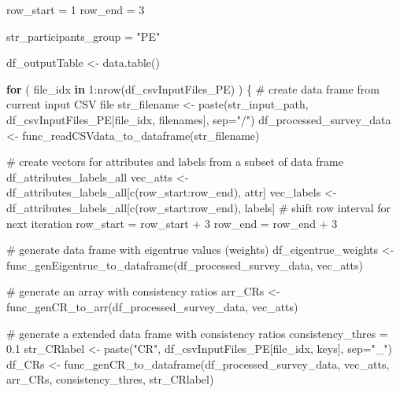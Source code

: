 \documentclass[
]{article}
\newenvironment{Shaded}{\begin{snugshade}}{\end{snugshade}}
\newcommand{\AttributeTok}[1]{\textcolor[rgb]{0.00,0.34,0.68}{#1}}
\newcommand{\CommentTok}[1]{\textcolor[rgb]{0.54,0.53,0.53}{#1}}
\newcommand{\ControlFlowTok}[1]{\textcolor[rgb]{0.12,0.11,0.11}{\textbf{#1}}}
\newcommand{\DecValTok}[1]{\textcolor[rgb]{0.69,0.50,0.00}{#1}}
\newcommand{\FloatTok}[1]{\textcolor[rgb]{0.69,0.50,0.00}{#1}}
\newcommand{\FunctionTok}[1]{\textcolor[rgb]{0.39,0.29,0.61}{#1}}
\newcommand{\NormalTok}[1]{\textcolor[rgb]{0.12,0.11,0.11}{#1}}
\newcommand{\OtherTok}[1]{\textcolor[rgb]{0.00,0.43,0.16}{#1}}
\newcommand{\SpecialCharTok}[1]{\textcolor[rgb]{0.24,0.68,0.91}{#1}}
\newcommand{\StringTok}[1]{\textcolor[rgb]{0.75,0.01,0.01}{#1}}
\begin{document}
\begin{Shaded}
\begin{Highlighting}[]
\NormalTok{row\_start }\OtherTok{=} \DecValTok{1}
\NormalTok{row\_end }\OtherTok{=} \DecValTok{3}

\NormalTok{str\_participants\_group }\OtherTok{=} \StringTok{"PE"}

\NormalTok{df\_outputTable }\OtherTok{\textless{}{-}} \FunctionTok{data.table}\NormalTok{()}

\ControlFlowTok{for}\NormalTok{ ( file\_idx }\ControlFlowTok{in} \DecValTok{1}\SpecialCharTok{:}\FunctionTok{nrow}\NormalTok{(df\_csvInputFiles\_PE) ) \{}
  \CommentTok{\# create data frame from current input CSV file}
\NormalTok{  str\_filename }\OtherTok{\textless{}{-}} \FunctionTok{paste}\NormalTok{(str\_input\_path, df\_csvInputFiles\_PE[file\_idx, filenames], }\AttributeTok{sep=}\StringTok{"/"}\NormalTok{)}
\NormalTok{  df\_processed\_survey\_data }\OtherTok{\textless{}{-}} \FunctionTok{func\_readCSVdata\_to\_dataframe}\NormalTok{(str\_filename)}
  
  \CommentTok{\# create vectors for attributes and labels from a subset of data frame \textquotesingle{}df\_attributes\_labels\_all\textquotesingle{}}
\NormalTok{  vec\_atts }\OtherTok{\textless{}{-}}\NormalTok{ df\_attributes\_labels\_all[}\FunctionTok{c}\NormalTok{(row\_start}\SpecialCharTok{:}\NormalTok{row\_end), attr]}
\NormalTok{  vec\_labels }\OtherTok{\textless{}{-}}\NormalTok{ df\_attributes\_labels\_all[}\FunctionTok{c}\NormalTok{(row\_start}\SpecialCharTok{:}\NormalTok{row\_end), labels]}
  \CommentTok{\# shift row interval for next iteration}
\NormalTok{  row\_start }\OtherTok{=}\NormalTok{ row\_start }\SpecialCharTok{+} \DecValTok{3}
\NormalTok{  row\_end }\OtherTok{=}\NormalTok{ row\_end }\SpecialCharTok{+} \DecValTok{3}
  
  \CommentTok{\# generate data frame with eigentrue values (weights) }
\NormalTok{  df\_eigentrue\_weights }\OtherTok{\textless{}{-}} \FunctionTok{func\_genEigentrue\_to\_dataframe}\NormalTok{(df\_processed\_survey\_data, vec\_atts)}
  
  \CommentTok{\# generate an array with consistency ratios}
\NormalTok{  arr\_CRs }\OtherTok{\textless{}{-}} \FunctionTok{func\_genCR\_to\_arr}\NormalTok{(df\_processed\_survey\_data, vec\_atts)}

  \CommentTok{\# generate a extended data frame with consistency ratios}
\NormalTok{  consistency\_thres }\OtherTok{=} \FloatTok{0.1}
\NormalTok{  str\_CRlabel }\OtherTok{\textless{}{-}} \FunctionTok{paste}\NormalTok{(}\StringTok{"CR"}\NormalTok{, df\_csvInputFiles\_PE[file\_idx, keys], }\AttributeTok{sep=}\StringTok{"\_"}\NormalTok{)}
\NormalTok{  df\_CRs }\OtherTok{\textless{}{-}} \FunctionTok{func\_genCR\_to\_dataframe}\NormalTok{(df\_processed\_survey\_data, vec\_atts, arr\_CRs, consistency\_thres, str\_CRlabel)}
  

\end{Highlighting}
\end{Shaded}
\end{document}
